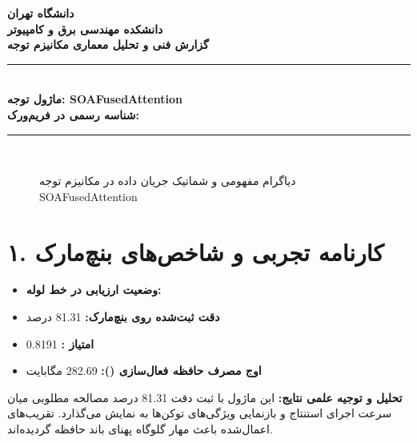 \documentclass[12pt,a4paper]{article}
\begin{document}
\begin{center}
{\Large\bfseries دانشگاه تهران}\\[0.2cm]
{\large\bfseries دانشکده مهندسی برق و کامپیوتر}\\[0.2cm]
{\large\bfseries گزارش فنی و تحلیل معماری مکانیزم توجه}\\[0.5cm]
\rule{\linewidth}{1pt}\\[0.3cm]
{\LARGE\bfseries ماژول توجه: SOAFusedAttention}\\[0.2cm]
{\large \textbf{شناسه رسمی در فریم‌ورک:} }\\[0.2cm]
\rule{\linewidth}{1pt}\\[0.5cm]
\end{center}

\begin{figure}[H]
\centering
{}
\caption{دیاگرام مفهومی و شماتیک جریان داده در مکانیزم توجه SOAFusedAttention}
\end{figure}

\section*{۱. کارنامه تجربی و شاخص‌های بنچ‌مارک}
\begin{itemize}
\item \textbf{وضعیت ارزیابی در خط لوله:} 
\item \textbf{دقت ثبت‌شده روی بنچ‌مارک:} 81.31 درصد
\item \textbf{امتیاز :} 0.8191
\item \textbf{اوج مصرف حافظه فعال‌سازی ():} 282.69 مگابایت
\end{itemize}
\textbf{تحلیل و توجیه علمی نتایج:} این ماژول با ثبت دقت 81.31 درصد مصالحه مطلوبی میان سرعت اجرای استنتاج و بازنمایی ویژگی‌های توکن‌ها به نمایش می‌گذارد. تقریب‌های اعمال‌شده باعث مهار گلوگاه پهنای باند حافظه گردیده‌اند.
\end{document}
